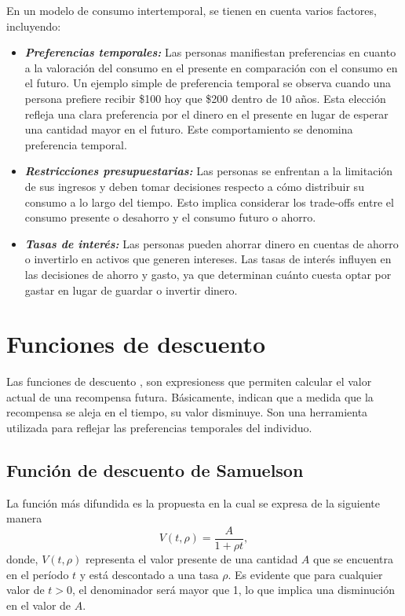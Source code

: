 En un modelo de consumo intertemporal, se tienen en cuenta varios factores, incluyendo:
\begin{itemize}
\item \textit{\textbf{Preferencias temporales:}} Las personas manifiestan preferencias en cuanto a la valoración del consumo en el presente en comparación con el consumo en el futuro. Un ejemplo simple de preferencia temporal se observa cuando una persona prefiere recibir \$100 hoy que \$200 dentro de 10 años. Esta elección refleja una clara preferencia por el dinero en el presente en lugar de esperar una cantidad mayor en el futuro. Este comportamiento se denomina preferencia temporal.

\item \textit{\textbf{Restricciones presupuestarias:}} Las personas se enfrentan a la limitación de sus ingresos y deben tomar decisiones respecto a cómo distribuir su consumo a lo largo del tiempo. Esto implica considerar los trade-offs entre el consumo presente o desahorro y el consumo futuro o ahorro.

\item \textit{\textbf{Tasas de interés:}} Las personas pueden ahorrar dinero en cuentas de ahorro o invertirlo en activos que generen intereses. Las tasas de interés influyen en las decisiones de ahorro y gasto, ya que determinan cuánto cuesta optar por gastar en lugar de guardar o invertir dinero.

\end{itemize}

\section{Funciones de descuento} 

Las funciones de descuento \parencite{Samuelson37,madden2010delaydiscounting, mazur1987adjusting,myerson1995discounting}, son expresioness que permiten calcular el valor actual de una recompensa futura. Básicamente, indican que a medida que la recompensa se aleja en el tiempo, su valor disminuye. Son una herramienta utilizada para reflejar las preferencias temporales del individuo.

\subsection{Función de descuento de Samuelson}
La función más difundida es la propuesta en \parencite{Samuelson37} la cual se expresa de la siguiente manera
$$V(t,\rho)= \dfrac{A}{1+\rho t},$$
donde, $V(t,\rho)$ representa el valor presente de una cantidad $A$ que se encuentra en el período $t$ y está descontado a una tasa $\rho$. Es evidente que para cualquier valor de $t > 0$, el denominador será mayor que 1, lo que implica una disminución en el valor de $A$. 

